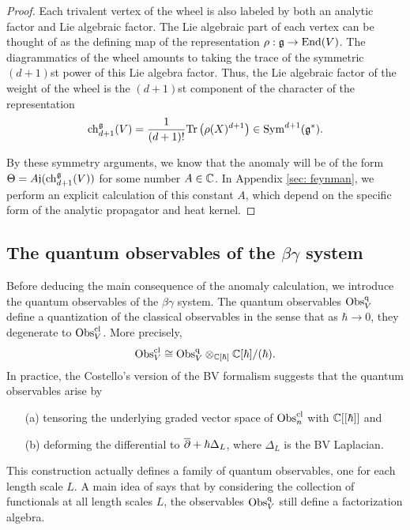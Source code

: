 \begin{proof}
Each trivalent vertex of the wheel is also labeled by both an analytic factor and Lie algebraic factor. 
The Lie algebraic part of each vertex can be thought of as the defining map of the representation $\rho : \mathfrak g \to {\rm End}(V)$. 
The diagrammatics of the wheel amounts to taking the trace of the symmetric $(d+1)$st power of this Lie algebra factor. 
Thus, the Lie algebraic factor of the weight of the wheel is the $(d+1)$st component of the character of the representation
\[
{\rm ch}_{d+1}^\mathfrak g(V) = \frac{1}{(d+1)!} {\rm Tr}\left(\rho(X)^{d+1}\right) \in {\rm Sym}^{d+1}(\mathfrak g^*) .
\]

By these symmetry arguments, we know that the anomaly will be of the form $\Theta = A \mathfrak j ({\rm ch}_{d+1}^{\mathfrak g}(V))$ for some number $A \in \mathbb C$.
In Appendix \ref{sec: feynman}, we perform an explicit calculation of this constant $A$, which depend on the specific form of the analytic propagator and heat kernel. 
\end{proof}


\subsection{The quantum observables of the $\beta\gamma$ system}

Before deducing the main consequence of the anomaly calculation, we introduce the quantum observables of the $\beta\gamma$ system. 
The quantum observables ${\rm Obs}^{{\rm q}}_V$ define a quantization of the classical observables in the sense that
as $\hbar \to 0$, they degenerate to ${\rm Obs}^{\rm cl}_V$.
More precisely, 
\[
{\rm Obs}^{{\rm cl}}_V \cong {\rm Obs}^{\rm q}_V \otimes_{\mathbb C[\hbar]} \mathbb C[\hbar]/(\hbar).
\]
In practice, the Costello's version of the BV formalism suggests that the quantum observables arise by 
\begin{enumerate}
\item[(a)] tensoring the underlying graded vector space of ${\rm Obs}^{\rm cl}_n$ with $\mathbb C[[\hbar]]$ and
\item[(b)] deforming the differential to $\overline{\partial} +\hbar \Delta_L$, where $\Delta_L$ is the BV Laplacian.
\end{enumerate}
This construction actually defines a family of quantum observables, one for each length scale $L$. 
A main idea of \cite{CG2} says that by considering the collection of functionals at all length scales $L$, the observables ${\rm Obs}^{\rm q}_V$ still define a factorization algebra. 

